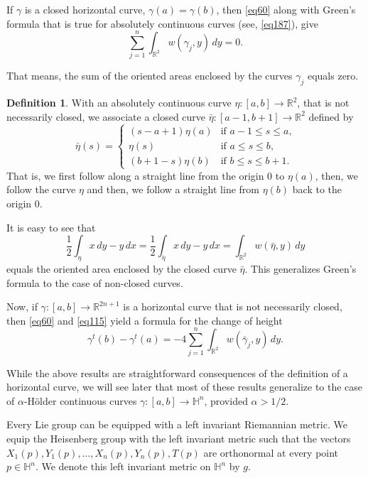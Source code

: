 \documentclass[intlimits,12pt,reqno]{amsart}
\newcommand{\bbbh}{\mathbb H}
\newcommand{\R}{\mathbb R}
\numberwithin{equation}{section}
\theoremstyle{definition}
\newtheorem{definition}[theorem]{Definition}
\begin{document}
If $\gamma$ is a closed horizontal curve, $\gamma(a)=\gamma(b)$, then \eqref{eq60} along with Green's formula that is true for absolutely continuous curves (see, \eqref{eq187}), give
$$
\sum_{j=1}^n\int_{\R^2} w(\gamma_j,y)\, dy=0.
$$

That means, the sum of the oriented areas enclosed by the curves $\gamma_j$ equals zero.
\begin{definition}
\label{d6}
With an absolutely continuous curve $\eta:[a,b]\to\R^2$, that is not necessarily closed, we associate a closed curve $\bar{\eta}:[a-1,b+1]\to\R^2$ defined by
$$
\bar{\eta}(s)=
\begin{cases}
(s-a+1)\eta(a) & \text{if $a-1\leq s\leq a$,}\\
\eta(s)        & \text{if $a\leq s\leq b$,}\\
(b+1-s)\eta(b) & \text{if $b\leq s\leq b+1$.}
\end{cases}
$$
That is, we first follow along a straight line from the origin $0$ to $\eta(a)$, then, we follow the curve $\eta$ and then, we follow a straight line from $\eta(b)$ back to the origin $0$. 
\end{definition}
It is easy to see that
\begin{equation}
\label{eq115}
\frac{1}{2}\int_\eta x\, dy-y\, dx =
\frac{1}{2}\int_{\bar{\eta}} x\, dy-y\, dx=
\int_{\R^2} w(\bar{\eta}, y)\, dy
\end{equation}
equals the oriented area enclosed by the closed curve $\bar{\eta}$. This generalizes Green's formula to the case of non-closed curves.

Now, if $\gamma:[a,b]\to\R^{2n+1}$ is a horizontal curve that is not necessarily closed, then \eqref{eq60} and \eqref{eq115} yield a formula for the change of height
\begin{equation}
\label{eq62}    
\gamma^t(b)-\gamma^t(a)=-4\sum_{j=1}^n \int_{\R^2} w(\bar{\gamma}_j,y)\, dy.
\end{equation}

While the above results are straightforward consequences of the definition of a horizontal curve, we will see later that most of these results generalize to the case of $\alpha$-H\"older continuous curves $\gamma:[a,b]\to\bbbh^n$, provided $\alpha>1/2$.

Every Lie group can be equipped with a left invariant Riemannian metric. We equip the Heisenberg
group with the left invariant metric such that the vectors
$X_1(p), Y_1(p),\ldots,X_n(p),Y_n(p),T(p)$ are orthonormal at every point $p\in\bbbh^n$.
We denote this left invariant metric on $\bbbh^n$ by $g$.
\end{document}
